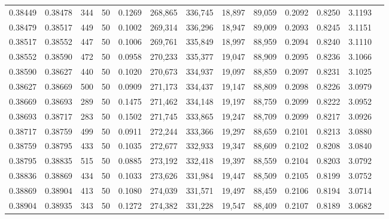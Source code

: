 \begin{tabular}{rrrrrrrrrrrrr}
0.38449 & 0.38478 &   344 &  50 &                                     0.1269 & 268,865 & 336,745 &  18,897 &  89,059 & 0.2092 & 0.8250 & 3.1193 \\
0.38479 & 0.38517 &   449 &  50 &                                     0.1002 & 269,314 & 336,296 &  18,947 &  89,009 & 0.2093 & 0.8245 & 3.1151 \\
0.38517 & 0.38552 &   447 &  50 &                                     0.1006 & 269,761 & 335,849 &  18,997 &  88,959 & 0.2094 & 0.8240 & 3.1110 \\
0.38552 & 0.38590 &   472 &  50 &                                     0.0958 & 270,233 & 335,377 &  19,047 &  88,909 & 0.2095 & 0.8236 & 3.1066 \\
0.38590 & 0.38627 &   440 &  50 &                                     0.1020 & 270,673 & 334,937 &  19,097 &  88,859 & 0.2097 & 0.8231 & 3.1025 \\
0.38627 & 0.38669 &   500 &  50 &                                     0.0909 & 271,173 & 334,437 &  19,147 &  88,809 & 0.2098 & 0.8226 & 3.0979 \\
0.38669 & 0.38693 &   289 &  50 &                                     0.1475 & 271,462 & 334,148 &  19,197 &  88,759 & 0.2099 & 0.8222 & 3.0952 \\
0.38693 & 0.38717 &   283 &  50 &                                     0.1502 & 271,745 & 333,865 &  19,247 &  88,709 & 0.2099 & 0.8217 & 3.0926 \\
0.38717 & 0.38759 &   499 &  50 &                                     0.0911 & 272,244 & 333,366 &  19,297 &  88,659 & 0.2101 & 0.8213 & 3.0880 \\
0.38759 & 0.38795 &   433 &  50 &                                     0.1035 & 272,677 & 332,933 &  19,347 &  88,609 & 0.2102 & 0.8208 & 3.0840 \\
0.38795 & 0.38835 &   515 &  50 &                                     0.0885 & 273,192 & 332,418 &  19,397 &  88,559 & 0.2104 & 0.8203 & 3.0792 \\
0.38836 & 0.38869 &   434 &  50 &                                     0.1033 & 273,626 & 331,984 &  19,447 &  88,509 & 0.2105 & 0.8199 & 3.0752 \\
0.38869 & 0.38904 &   413 &  50 &                                     0.1080 & 274,039 & 331,571 &  19,497 &  88,459 & 0.2106 & 0.8194 & 3.0714 \\
0.38904 & 0.38935 &   343 &  50 &                                     0.1272 & 274,382 & 331,228 &  19,547 &  88,409 & 0.2107 & 0.8189 & 3.0682 \\

\end{tabular}
